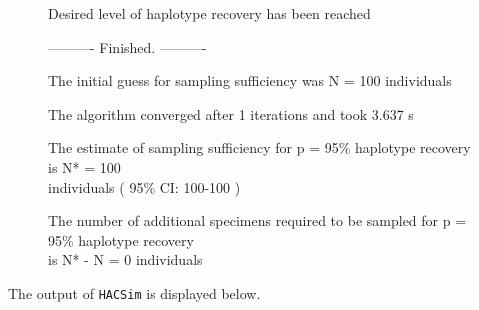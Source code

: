 \begin{figure}[H]
{\vspace{3mm}
 
\noindent Desired level of haplotype recovery has been reached 

\vspace{3mm}

\noindent ---------- Finished. ----------
        
\noindent The initial guess for sampling sufficiency was N = 100 individuals
 
\noindent The algorithm converged after 1 iterations and took 3.637 s
 
\noindent The estimate of sampling sufficiency for p = 95\% haplotype recovery is N* = 100 \\ individuals ( 95\% CI: 100-100 )
 
\noindent The number of additional specimens required to be sampled for p = 95\% haplotype recovery \\ is N* - N = 0 individuals 

}

\end{figure}


\noindent The output of {\tt HACSim} is displayed below. 

\vspace{3mm}

